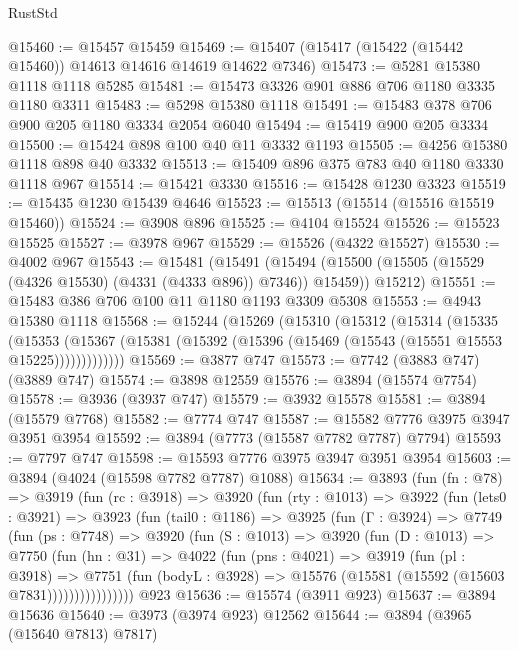 \begin{lexlean}{RustStd}
\begin{coremodule}
@15460 := @15457 @15459
@15469 := @15407 (@15417 (@15422 (@15442 @15460)) @14613 @14616 @14619 @14622 @7346)
@15473 := @5281 @15380 @1118 @1118 @5285
@15481 := @15473 @3326 @901 @886 @706 @1180 @3335 @1180 @3311
@15483 := @5298 @15380 @1118
@15491 := @15483 @378 @706 @900 @205 @1180 @3334 @2054 @6040
@15494 := @15419 @900 @205 @3334
@15500 := @15424 @898 @100 @40 @11 @3332 @1193
@15505 := @4256 @15380 @1118 @898 @40 @3332
@15513 := @15409 @896 @375 @783 @40 @1180 @3330 @1118 @967
@15514 := @15421 @3330
@15516 := @15428 @1230 @3323
@15519 := @15435 @1230 @15439 @4646
@15523 := @15513 (@15514 (@15516 @15519 @15460))
@15524 := @3908 @896
@15525 := @4104 @15524
@15526 := @15523 @15525
@15527 := @3978 @967
@15529 := @15526 (@4322 @15527)
@15530 := @4002 @967
@15543 := @15481
    (@15491
      (@15494 (@15500 (@15505 (@15529 (@4326 @15530) (@4331 (@4333 @896)) @7346)) @15459))
      @15212)
@15551 := @15483 @386 @706 @100 @11 @1180 @1193 @3309 @5308
@15553 := @4943 @15380 @1118
@15568 := @15244
    (@15269
      (@15310
        (@15312
          (@15314
            (@15335
              (@15353
                (@15367 (@15381 (@15392 (@15396 (@15469 (@15543 (@15551 @15553 @15225)))))))))))))
@15569 := @3877 @747
@15573 := @7742 (@3883 @747) (@3889 @747)
@15574 := @3898 @12559
@15576 := @3894 (@15574 @7754)
@15578 := @3936 (@3937 @747)
@15579 := @3932 @15578
@15581 := @3894 (@15579 @7768)
@15582 := @7774 @747
@15587 := @15582 @7776 @3975 @3947 @3951 @3954
@15592 := @3894 (@7773 (@15587 @7782 @7787) @7794)
@15593 := @7797 @747
@15598 := @15593 @7776 @3975 @3947 @3951 @3954
@15603 := @3894 (@4024 (@15598 @7782 @7787) @1088)
@15634 := @3893
    (fun (fn : @78) =>
    @3919
      (fun (rc : @3918) =>
      @3920
        (fun (rty : @1013) =>
        @3922
          (fun (lets0 : @3921) =>
          @3923
            (fun (tail0 : @1186) =>
            @3925
              (fun (Γ : @3924) =>
              @7749
                (fun (ps : @7748) =>
                @3920
                  (fun (S : @1013) =>
                  @3920
                    (fun (D : @1013) =>
                    @7750
                      (fun (hn : @31) =>
                      @4022
                        (fun (pns : @4021) =>
                        @3919
                          (fun (pl : @3918) =>
                          @7751
                            (fun (bodyL : @3928) =>
                            @15576 (@15581 (@15592 (@15603 @7831))))))))))))))))
    @923
@15636 := @15574 (@3911 @923)
@15637 := @3894 @15636
@15640 := @3973 (@3974 @923) @12562
@15644 := @3894 (@3965 (@15640 @7813) @7817)

\end{coremodule}
\end{lexlean}
